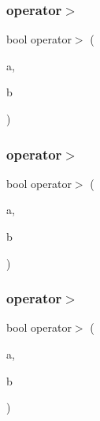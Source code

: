 \mbox{\label{class_f_l___f_p_ab237b013e66f2d39a3bb466e36741baf}} 
\subsubsection{\texorpdfstring{operator$>$}{operator>}\hspace{0.1cm}{\footnotesize\ttfamily [1/3]}}
{\footnotesize\ttfamily bool operator$>$ (\begin{DoxyParamCaption}\item[{const \hyperlink{class_f_l___f_p}{F\+L\+\_\+\+FP} \&}]{a,  }\item[{const \hyperlink{class_f_l___f_p}{F\+L\+\_\+\+FP} \&}]{b }\end{DoxyParamCaption})\hspace{0.3cm}{\ttfamily [friend]}}

\mbox{\label{class_f_l___f_p_acc2241533b3b7f53f6e8bc40c77233a5}} 
\subsubsection{\texorpdfstring{operator$>$}{operator>}\hspace{0.1cm}{\footnotesize\ttfamily [2/3]}}
{\footnotesize\ttfamily bool operator$>$ (\begin{DoxyParamCaption}\item[{const \hyperlink{class_f_l___f_p}{F\+L\+\_\+\+FP} \&}]{a,  }\item[{const double \&}]{b }\end{DoxyParamCaption})\hspace{0.3cm}{\ttfamily [friend]}}

\mbox{\label{class_f_l___f_p_aed84a1784274a020d95f2c01746f2b5c}} 
\subsubsection{\texorpdfstring{operator$>$}{operator>}\hspace{0.1cm}{\footnotesize\ttfamily [3/3]}}
{\footnotesize\ttfamily bool operator$>$ (\begin{DoxyParamCaption}\item[{const double \&}]{a,  }\item[{const \hyperlink{class_f_l___f_p}{F\+L\+\_\+\+FP} \&}]{b }\end{DoxyParamCaption})\hspace{0.3cm}{\ttfamily [friend]}}

